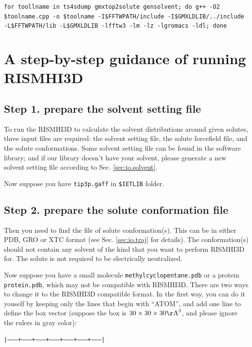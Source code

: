 \documentclass[aip,amsmath,amssymb,reprint,onecolumn]{revtex4-1}
\begin{document}
\texttt{\small\color{blue}for toollname in ts4sdump gmxtop2solute gensolvent; do g++ -O2 \$toolname.cpp -o \$toolname -I\$FFTWPATH/include -I\$GMXLDLIB/../include -L\$FFTWPATH/lib -L\$GMXLDLIB -lfftw3 -lm -lz -lgromacs -ldl; done}



\section{A step-by-step guidance of running RISMHI3D}

\subsection*{Step 1. prepare the solvent setting file}

To run the RISMHI3D to calculate the solvent distributions around given solutes, three input files are required: the solvent setting file, the solute forcefield file, and the solute conformations. Some solvent setting file can be found in the software library; and if our library doesn't have your solvent, please generate a new solvent setting file according to Sec. \ref{sec:io.solvent}.

Now suppose you have \texttt{tip3p.gaff} in \texttt{\$IETLIB} folder.

\subsection*{Step 2. prepare the solute conformation file}

Then you need to find the file of solute conformation(s). This can be in either PDB, GRO or XTC format (see Sec. \ref{sec:io.traj} for details). The conformation(s) should not contain any solvent of the kind that you want to perform RISMHI3D for. The solute is not required to be electrically neutralized.

Now suppose you have a small molecule \texttt{methylcyclopentane.pdb} or a protein \texttt{protein.pdb}, which may not be compatible with RISMHI3D. There are two ways to change it to the RISMHI3D compatible format. In the first way, you can do it youself by keeping only the lines that begin with ``ATOM'', and add one line to define the box vector (suppose the box is $30\times 30\times 30 {\rm\AA}^3$, and please ignore the rulers in gray color):

\texttt{\color[rgb]{0.7,0.7,0.7}\small |--------+---------+---------+---------+---------+---------+---------|}
\end{document}
